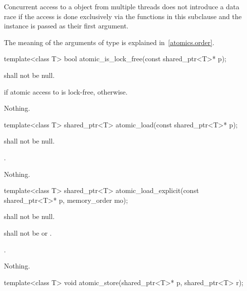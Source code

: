 \pnum
Concurrent access to a  object from multiple threads does not
introduce a data race if the access is done exclusively via the functions in
this subclause and the instance is passed as their first argument.

\pnum
The meaning of the arguments of type  is explained in~\ref{atomics.order}.

%
\begin{itemdecl}
template<class T> bool atomic_is_lock_free(const shared_ptr<T>* p);
\end{itemdecl}

\begin{itemdescr}
\pnum
\requires {} shall not be null.

\pnum
\returns {} if atomic access to  is lock-free,  otherwise.

\pnum
\throws Nothing.
\end{itemdescr}

%
\begin{itemdecl}
template<class T> shared_ptr<T> atomic_load(const shared_ptr<T>* p);
\end{itemdecl}

\begin{itemdescr}
\pnum
\requires {} shall not be null.

\pnum
\returns {}.

\pnum
\throws Nothing.
\end{itemdescr}

%
\begin{itemdecl}
template<class T> shared_ptr<T> atomic_load_explicit(const shared_ptr<T>* p, memory_order mo);
\end{itemdecl}

\begin{itemdescr}
\pnum
\requires {} shall not be null.

\pnum
\requires {} shall not be  or .

\pnum
\returns {}.

\pnum
\throws Nothing.
\end{itemdescr}

%
\begin{itemdecl}
template<class T> void atomic_store(shared_ptr<T>* p, shared_ptr<T> r);
\end{itemdecl}

